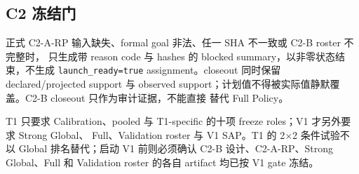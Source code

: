 \subsection{C2 冻结门}

正式 C2-A-RP 输入缺失、formal goal 非法、任一 SHA 不一致或 C2-B roster 不完整时，
只生成带 reason code 与 hashes 的 blocked summary，以非零状态结束，不生成
\texttt{launch\_ready=true} assignment。closeout 同时保留 declared/projected support 与
observed support；计划值不得被实际值静默覆盖。C2-B closeout 只作为审计证据，不能直接
替代 Full Policy。

T1 只要求 Calibration、pooled 与 T1-specific 的十项 freeze roles；V1 才另外要求 Strong Global、
Full、Validation roster 与 V1 SAP。T1 的 2$\times$2 条件试验不以 Global 排名替代；启动 V1
前则必须确认 C2-B 设计、C2-A-RP、Strong Global、Full 和 Validation roster 的各自 artifact
均已按 V1 gate 冻结。
